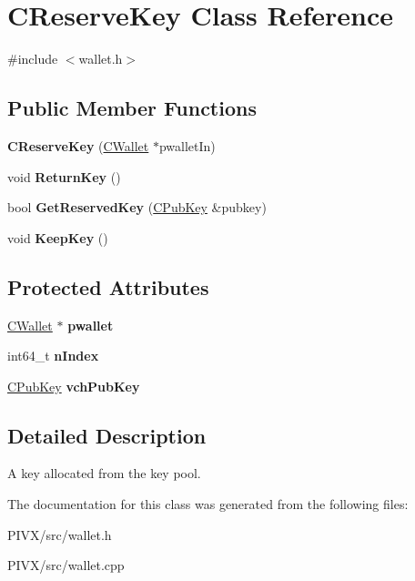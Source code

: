 \hypertarget{class_c_reserve_key}{}\section{C\+Reserve\+Key Class Reference}
\label{class_c_reserve_key}


{\ttfamily \#include $<$wallet.\+h$>$}

\subsection*{Public Member Functions}
\begin{DoxyCompactItemize}
\item 
\mbox{\label{class_c_reserve_key_ab5c15654a1e28bf5f2852512381d07c4}} 
{\bfseries C\+Reserve\+Key} (\mbox{\hyperlink{class_c_wallet}{C\+Wallet}} $\ast$pwallet\+In)
\item 
void {\bfseries Return\+Key} ()
\item 
bool {\bfseries Get\+Reserved\+Key} (\mbox{\hyperlink{class_c_pub_key}{C\+Pub\+Key}} \&pubkey)
\item 
void {\bfseries Keep\+Key} ()
\end{DoxyCompactItemize}
\subsection*{Protected Attributes}
\begin{DoxyCompactItemize}
\item 
\mbox{\label{class_c_reserve_key_aab8a4052c0b9a4337248ae53e77c6115}} 
\mbox{\hyperlink{class_c_wallet}{C\+Wallet}} $\ast$ {\bfseries pwallet}
\item 
\mbox{\label{class_c_reserve_key_a16d05c9be039eb772f2daf412cca1991}} 
int64\+\_\+t {\bfseries n\+Index}
\item 
\mbox{\label{class_c_reserve_key_a2b252444577b6aca8b497c2207ff17a4}} 
\mbox{\hyperlink{class_c_pub_key}{C\+Pub\+Key}} {\bfseries vch\+Pub\+Key}
\end{DoxyCompactItemize}


\subsection{Detailed Description}
A key allocated from the key pool. 

The documentation for this class was generated from the following files\+:\begin{DoxyCompactItemize}
\item 
P\+I\+V\+X/src/wallet.\+h\item 
P\+I\+V\+X/src/wallet.\+cpp\end{DoxyCompactItemize}
